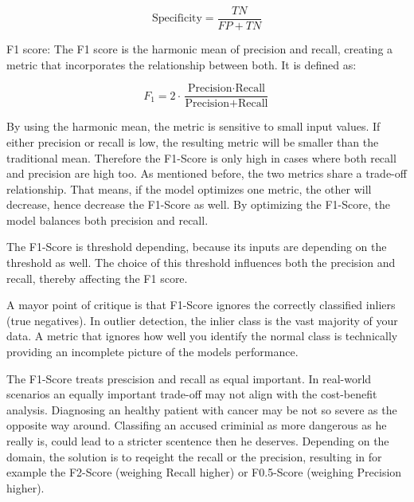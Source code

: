     \begin{equation}
        \text{Specificity} = \frac{TN}{FP + TN}
    \end{equation}

    \item F1 score: The F1 score is the harmonic mean of precision and recall, creating a metric that incorporates the relationship between both. 
    It is defined as: 
    
    \begin{equation}
    F_1 = 2 \cdot \frac{\text{Precision} \cdot \text{Recall}}{\text{Precision} + \text{Recall}}
    \end{equation}

    By using the harmonic mean, the metric is sensitive to small input values.
    If either precision or recall is low, the resulting metric will be smaller than the traditional mean. 
    Therefore the F1-Score is only high in cases where both recall and precision are high too.
    As mentioned before, the two metrics share a trade-off relationship.
    That means, if the model optimizes one metric, the other will decrease, hence decrease the F1-Score as well.
    By optimizing the F1-Score, the model balances both precision and recall.


    The F1-Score is threshold depending, because its inputs are depending on the threshold as well.
    The choice of this threshold influences both the precision and recall, thereby affecting the F1 score.
    

    A mayor point of critique is that F1-Score ignores the correctly classified inliers (true negatives).
    In outlier detection, the inlier class is the vast majority of your data.
    A metric that ignores how well you identify the normal class is technically providing an incomplete picture of the models performance.
        
        
    The F1-Score treats prescision and recall as equal important.
    In real-world scenarios an equally important trade-off may not align with the cost-benefit analysis.
    Diagnosing an healthy patient with cancer may be not so severe as the opposite way around.
    Classifing an accused criminial as more dangerous as he really is, could lead to a stricter scentence then he deserves. 
    Depending on the domain, the solution is to reqeight the recall or the precision, resulting in for example the F2-Score (weighing Recall higher) or F0.5-Score (weighing Precision higher).

\citep[p.430]{sokolova2009systematic}
\endenumerate
{}

